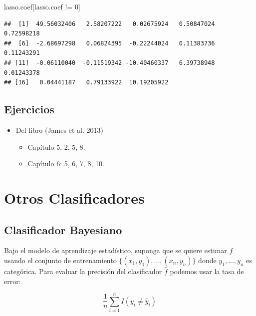 \documentclass[
  12pt,
]{book}
\newenvironment{Shaded}{\begin{snugshade}}{\end{snugshade}}
\newcommand{\DecValTok}[1]{\textcolor[rgb]{0.00,0.00,0.81}{#1}}
\newcommand{\NormalTok}[1]{#1}
\newcommand{\SpecialCharTok}[1]{\textcolor[rgb]{0.00,0.00,0.00}{#1}}
\providecommand{\tightlist}{%
  \setlength{\itemsep}{0pt}\setlength{\parskip}{0pt}}
\begin{document}
\begin{Shaded}
\begin{Highlighting}[]
\NormalTok{lasso.coef[lasso.coef }\SpecialCharTok{!=} \DecValTok{0}\NormalTok{]}
\end{Highlighting}
\end{Shaded}

\begin{verbatim}
##  [1]  49.56032406   2.58207222   0.02675924   0.50847024   0.72598218
##  [6]  -2.68697298   0.06824395  -0.22244024   0.11383736   0.11243291
## [11]  -0.06110040  -0.11519342 -10.40460337   6.39738948   0.01243378
## [16]   0.04441187   0.79133922  10.19205922
\end{verbatim}

\hypertarget{ejercicios-4}{%
\section{Ejercicios}\label{ejercicios-4}}

\begin{itemize}
\tightlist
\item
  Del libro (James et al. 2013)

  \begin{itemize}
  \tightlist
  \item
    Capítulo 5. 2, 5, 8.
  \item
    Capítulo 6: 5, 6, 7, 8, 10.
  \end{itemize}
\end{itemize}

\hypertarget{otros-clasificadores}{%
\chapter{Otros Clasificadores}\label{otros-clasificadores}}

\hypertarget{clasificador-bayesiano}{%
\section{Clasificador Bayesiano}\label{clasificador-bayesiano}}

Bajo el modelo de aprendizaje estadístico, suponga que se quiere estimar
\(f\) usando el conjunto de entrenamiento
\(\{(x_1,y_1),\ldots,(x_n,y_n)\}\) donde \(y_1,\ldots,y_n\) es
categórica. Para evaluar la precisión del clasificador \(\hat f\)
podemos usar la tasa de error:

\[\frac 1 n \sum_{i=1}^nI(y_i\neq \hat y_i)\]
\end{document}
